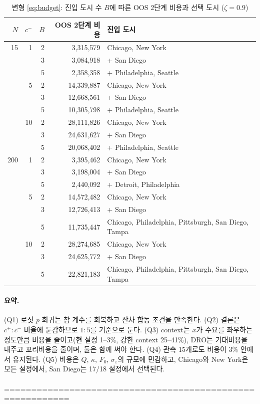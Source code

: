 \documentclass[10pt,a4paper]{article}
\begin{document}
\begin{table}[H]\centering\small
\caption{변형 \eqref{eq:budget}: 진입 도시 수 $B$에 따른 OOS 2단계 비용과 선택 도시 ($\zeta=0.9$)}\label{tab:budget}
\begin{tabular}{@{}rrrrl@{}}
\toprule
$N$ & $c^-$ & $B$ & OOS 2단계 비용 & 진입 도시 \\ \midrule
15  & 1  & 2 & 3{,}315{,}579 & Chicago, New York \\
    &    & 3 & 3{,}084{,}918 & + San Diego \\
    &    & 5 & 2{,}358{,}358 & + Philadelphia, Seattle \\
    & 5  & 2 & 14{,}339{,}887 & Chicago, New York \\
    &    & 3 & 12{,}668{,}561 & + San Diego \\
    &    & 5 & 10{,}305{,}798 & + Philadelphia, Seattle \\
    & 10 & 2 & 28{,}111{,}826 & Chicago, New York \\
    &    & 3 & 24{,}631{,}627 & + San Diego \\
    &    & 5 & 20{,}068{,}402 & + Philadelphia, Seattle \\ \midrule
200 & 1  & 2 & 3{,}395{,}462 & Chicago, New York \\
    &    & 3 & 3{,}198{,}004 & + San Diego \\
    &    & 5 & 2{,}440{,}092 & + Detroit, Philadelphia \\
    & 5  & 2 & 14{,}572{,}482 & Chicago, New York \\
    &    & 3 & 12{,}726{,}413 & + San Diego \\
    &    & 5 & 11{,}735{,}447 & Chicago, Philadelphia, Pittsburgh, San Diego, Tampa \\
    & 10 & 2 & 28{,}274{,}685 & Chicago, New York \\
    &    & 3 & 24{,}625{,}772 & + San Diego \\
    &    & 5 & 22{,}821{,}183 & Chicago, Philadelphia, Pittsburgh, San Diego, Tampa \\
\bottomrule
\end{tabular}
\end{table}

\paragraph{요약.}
(Q1) 로짓 $p$ 회귀는 참 계수를 회복하고 잔차 합동 조건을 만족한다. (Q2) 결론은 $c^+:c^-$ 비율에 둔감하므로 $1:5$를 기준으로 둔다. (Q3) context는 $x$가 수요를 좌우하는 정도만큼 비용을 줄이고(현 설정 1--3\%, 강한 context 25--41\%), DRO는 기대비용을 내주고 꼬리비용을 줄이며, 둘은 함께 써야 한다. (Q4) 관측 15개로도 비용이 3\% 안에서 유지된다. (Q5) 비용은 $Q$, $\kappa$, $F_0$, $\sigma_\varepsilon$의 규모에 민감하고, Chicago와 New York은 모든 설정에서, San Diego는 17/18 설정에서 선택된다.
\\
\\
==========================================================
\end{document}
